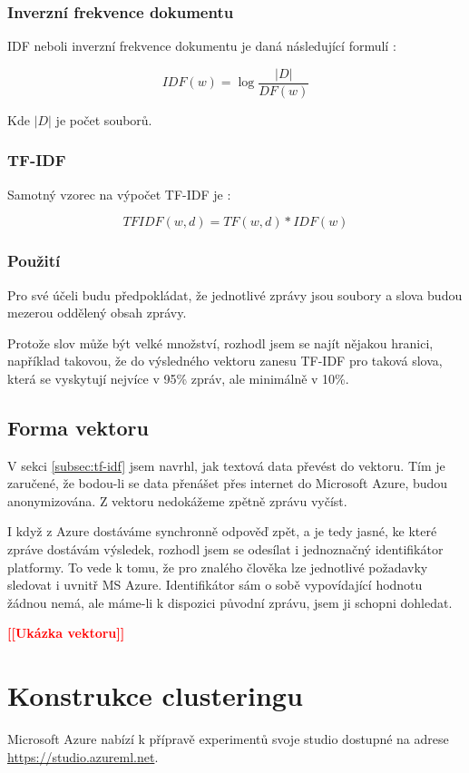 \documentclass[thesis=M,czech]{FITthesis}[2012/10/20]
\newcommand{\todo}[1]{\textcolor{red}{\textbf{[[#1]]}}}
\begin{document}
		\subsubsection{Inverzní frekvence dokumentu}
		IDF neboli inverzní frekvence dokumentu je daná následující formulí \cite{Ramos_0}:
		
		$$ IDF(w) = \log{\frac{|D|}{DF(w)}}$$  
		
		Kde $|D|$ je počet souborů.
		
		\subsubsection{TF-IDF}
		Samotný vzorec na výpočet TF-IDF je \cite{Neto_0}: 
		
		$$TFIDF(w,d) = TF(w,d) * IDF(w) $$
		
		\subsubsection{Použití}
		Pro své účeli budu předpokládat, že jednotlivé zprávy jsou soubory a slova budou mezerou oddělený obsah zprávy. 
		
		Protože slov může být velké množství, rozhodl jsem se najít nějakou hranici, například takovou, že do výsledného vektoru zanesu TF-IDF pro taková slova, která se vyskytují nejvíce v 95\% zpráv, ale minimálně v 10\%.
		
		\subsection{Forma vektoru}
		V sekci \ref{subsec:tf-idf} jsem navrhl, jak textová data převést do vektoru. Tím je zaručené, že bodou-li se data přenášet přes internet do Microsoft Azure, budou anonymizována. Z vektoru nedokážeme zpětně zprávu vyčíst.
		
		I když z Azure dostáváme synchronně odpověď zpět, a je tedy jasné, ke které zpráve dostávám výsledek, rozhodl jsem se odesílat i jednoznačný identifikátor platformy. To vede k tomu, že pro znalého člověka lze jednotlivé požadavky sledovat i uvnitř MS Azure. Identifikátor sám o sobě vypovídající hodnotu žádnou nemá, ale máme-li k dispozici původní zprávu, jsem ji schopni dohledat.
		
		\todo{Ukázka vektoru}
		
	\section{Konstrukce clusteringu}
		\label{sec:construc_clustering}
		Microsoft Azure nabízí k přípravě experimentů svoje studio dostupné na adrese \url{https://studio.azureml.net}.
		
\end{document}
